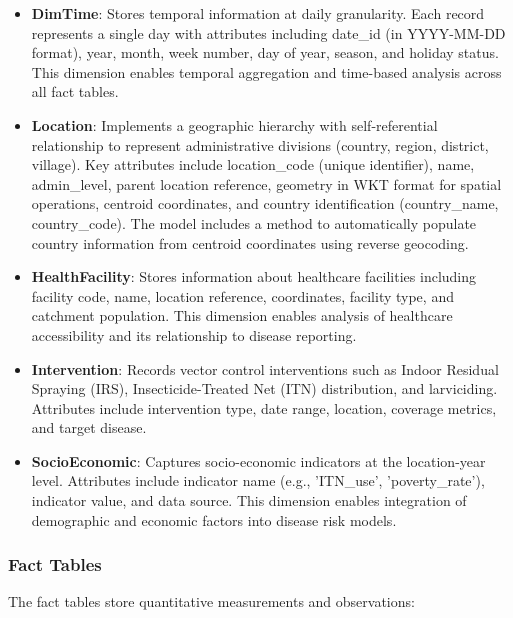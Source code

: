 \documentclass{article}
\begin{document}
\begin{itemize}
    \item \textbf{DimTime}: Stores temporal information at daily granularity. Each record represents a single day with attributes 
    including date\_id (in YYYY-MM-DD format), year, month, week number, day of year, season, and holiday status. This dimension 
    enables temporal aggregation and time-based analysis across all fact tables.

    \item \textbf{Location}: Implements a geographic hierarchy with self-referential relationship to represent administrative 
    divisions (country, region, district, village). Key attributes include location\_code (unique identifier), name, admin\_level, 
    parent location reference, geometry in WKT format for spatial operations, centroid coordinates, and country identification 
    (country\_name, country\_code). The model includes a method to automatically populate country information from centroid 
    coordinates using reverse geocoding.

    \item \textbf{HealthFacility}: Stores information about healthcare facilities including facility code, name, location 
    reference, coordinates, facility type, and catchment population. This dimension enables analysis of healthcare accessibility 
    and its relationship to disease reporting.

    \item \textbf{Intervention}: Records vector control interventions such as Indoor Residual Spraying (IRS), 
    Insecticide-Treated Net (ITN) distribution, and larviciding. Attributes include intervention type, date range, 
    location, coverage metrics, and target disease.

    \item \textbf{SocioEconomic}: Captures socio-economic indicators at the location-year level. Attributes include 
    indicator name (e.g., 'ITN\_use', 'poverty\_rate'), indicator value, and data source. This dimension enables integration 
    of demographic and economic factors into disease risk models.
\end{itemize}

\subsubsection{Fact Tables}

The fact tables store quantitative measurements and observations:
\end{document}
